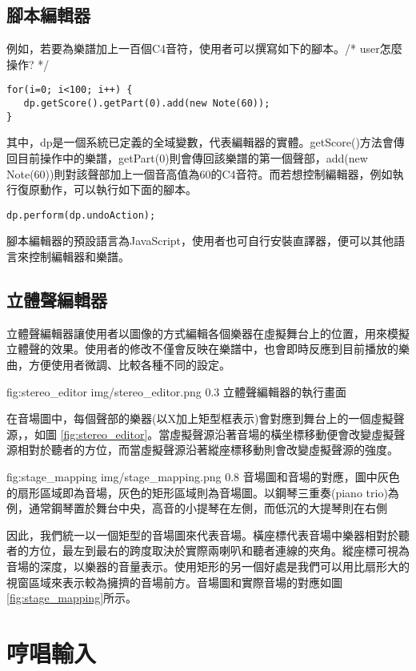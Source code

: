 \documentclass[12pt,a4paper,oneside]{report}
\begin{document}
\section{腳本編輯器}

例如，若要為樂譜加上一百個C4音符，使用者可以撰寫如下的腳本。/* user怎麼操作? */

\begin{verbatim}
for(i=0; i<100; i++) { 
   dp.getScore().getPart(0).add(new Note(60));
}
\end{verbatim}

其中，dp是一個系統已定義的全域變數，代表編輯器的實體。getScore()方法會傳回目前操作中的樂譜，getPart(0)則會傳回該樂譜的第一個聲部，add(new Note(60))則對該聲部加上一個音高值為60的C4音符。而若想控制編輯器，例如執行復原動作，可以執行如下面的腳本。

\begin{verbatim}
dp.perform(dp.undoAction);
\end{verbatim}

腳本編輯器的預設語言為JavaScript，使用者也可自行安裝直譯器，便可以其他語言來控制編輯器和樂譜。

\section{立體聲編輯器}
立體聲編輯器讓使用者以圖像的方式編輯各個樂器在虛擬舞台上的位置，用來模擬立體聲的效果。使用者的修改不僅會反映在樂譜中，也會即時反應到目前播放的樂曲，方便使用者微調、比較各種不同的設定。

\figurewithcaption
{fig:stereo_editor}
{img/stereo_editor.png}
{0.3}
{立體聲編輯器的執行畫面}

在音場圖中，每個聲部的樂器(以X加上矩型框表示)會對應到舞台上的一個虛擬聲源，，如圖 \ref{fig:stereo_editor}。當虛擬聲源沿著音場的橫坐標移動便會改變虛擬聲源相對於聽者的方位，而當虛擬聲源沿著縱座標移動則會改變虛擬聲源的強度。

\figurewithcaption
{fig:stage_mapping}
{img/stage_mapping.png}
{0.8}
{音場圖和音場的對應，圖中灰色的扇形區域即為音場，灰色的矩形區域則為音場圖。以鋼琴三重奏(piano trio)為例，通常鋼琴置於舞台中央，高音的小提琴在左側，而低沉的大提琴則在右側}

因此，我們統一以一個矩型的音場圖來代表音場。橫座標代表音場中樂器相對於聽者的方位，最左到最右的跨度取決於實際兩喇叭和聽者連線的夾角。縱座標可視為音場的深度，以樂器的音量表示。使用矩形的另一個好處是我們可以用比扇形大的視窗區域來表示較為擁擠的音場前方。音場圖和實際音場的對應如圖 \ref{fig:stage_mapping}所示。
\chapter{哼唱輸入} %
\end{document}

